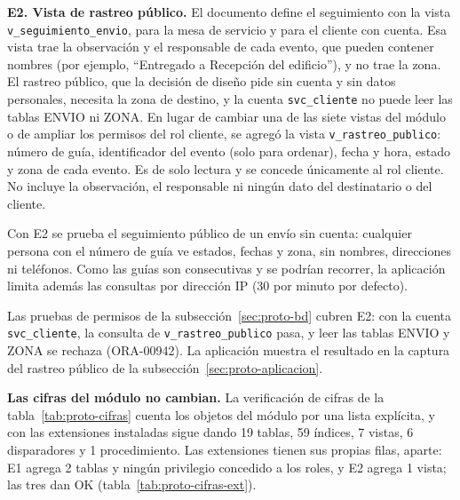{\sloppy
\textbf{E2. Vista de rastreo público.} El documento define el seguimiento
con la vista \texttt{v\_\allowbreak seguimiento\_\allowbreak envio}, para la mesa de servicio y
para el cliente con cuenta. Esa vista trae la observación y el responsable
de cada evento, que pueden contener nombres (por ejemplo, ``Entregado a
Recepción del edificio''), y no trae la zona. El rastreo público, que la
decisión de diseño pide sin cuenta y sin datos personales, necesita
la zona de destino, y la cuenta \texttt{svc\_\allowbreak cliente} no puede leer las tablas
ENVIO ni ZONA. En lugar de cambiar una de las siete vistas del módulo o
de ampliar los permisos del rol cliente, se agregó la vista
\texttt{v\_\allowbreak rastreo\_\allowbreak publico}: número de guía, identificador del evento
(solo para ordenar), fecha y hora, estado y zona de cada evento. Es de solo
lectura y se concede únicamente al rol cliente. No incluye la observación, el
responsable ni ningún dato del destinatario o del cliente.
\par}

Con E2 se prueba el seguimiento público de un envío sin cuenta: cualquier
persona con el número de guía ve estados, fechas y zona, sin nombres,
direcciones ni teléfonos. Como las guías son consecutivas y se podrían recorrer,
la aplicación limita además las consultas por dirección IP (30 por minuto por
defecto).

Las pruebas de permisos de la subsección~\ref{sec:proto-bd} cubren E2: con
la cuenta \texttt{svc\_cliente}, la consulta de \texttt{v\_rastreo\_publico}
pasa, y leer las tablas ENVIO y ZONA se rechaza (ORA-00942). La
aplicación muestra el resultado en la captura del rastreo público de la
subsección~\ref{sec:proto-aplicacion}.

\textbf{Las cifras del módulo no cambian.} La verificación de cifras de
la tabla~\ref{tab:proto-cifras} cuenta los objetos del módulo por una lista
explícita, y con las extensiones instaladas sigue dando 19 tablas, 59
índices, 7 vistas, 6 disparadores y 1 procedimiento. Las extensiones
tienen sus propias filas, aparte: E1 agrega 2 tablas y ningún privilegio
concedido a los roles, y E2 agrega 1 vista; las tres dan OK
(tabla~\ref{tab:proto-cifras-ext}).

